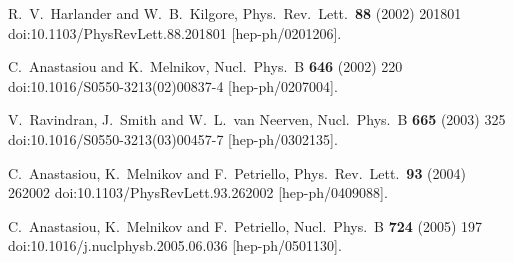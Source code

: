 
  R.~V.~Harlander and W.~B.~Kilgore,
  Phys.\ Rev.\ Lett.\  {\bf 88} (2002) 201801
  doi:10.1103/PhysRevLett.88.201801
  [hep-ph/0201206].

  C.~Anastasiou and K.~Melnikov,
  Nucl.\ Phys.\ B {\bf 646} (2002) 220
  doi:10.1016/S0550-3213(02)00837-4
  [hep-ph/0207004].

  V.~Ravindran, J.~Smith and W.~L.~van Neerven,
  Nucl.\ Phys.\ B {\bf 665} (2003) 325
  doi:10.1016/S0550-3213(03)00457-7
  [hep-ph/0302135].






  C.~Anastasiou, K.~Melnikov and F.~Petriello,
  Phys.\ Rev.\ Lett.\  {\bf 93} (2004) 262002
  doi:10.1103/PhysRevLett.93.262002
  [hep-ph/0409088].

  C.~Anastasiou, K.~Melnikov and F.~Petriello,
  Nucl.\ Phys.\ B {\bf 724} (2005) 197
  doi:10.1016/j.nuclphysb.2005.06.036
  [hep-ph/0501130].

